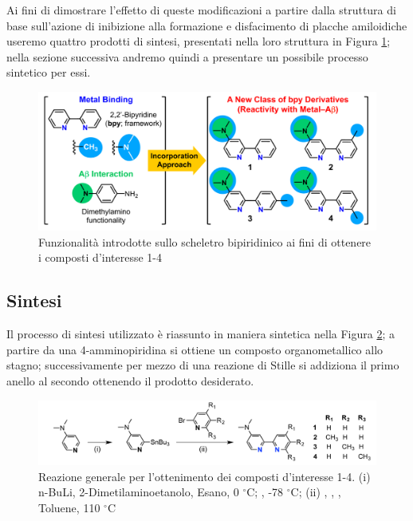 \documentclass[a4paper, 12pt]{article}
\begin{document}
Ai fini di dimostrare l'effetto di queste modificazioni a partire dalla struttura di base sull'azione di inibizione alla formazione e disfacimento di placche amiloidiche useremo quattro prodotti di sintesi, presentati nella loro struttura in Figura \ref{fig:bpy_mod}; nella sezione successiva andremo quindi a presentare un possibile processo sintetico per essi.

\begin{figure}[H]
	\centering
	\includegraphics[width=\linewidth]{immagini/bpy_mod.png}
	\caption{Funzionalità introdotte sullo scheletro bipiridinico ai fini di ottenere i composti d'interesse 1-4}
	\label{fig:bpy_mod}
\end{figure}

\subsection{Sintesi}
Il processo di sintesi utilizzato è riassunto in maniera sintetica nella Figura \ref{fig:rea_g}; a partire da una 4-amminopiridina si ottiene un composto organometallico allo stagno; successivamente per mezzo di una reazione di Stille si addiziona il primo anello al secondo ottenendo il prodotto desiderato.

\begin{figure}[H]
	\centering
	\includegraphics[width=\linewidth]{immagini/rea_g.png}
	\caption{Reazione generale per l'ottenimento dei composti d'interesse 1-4. (i) n-BuLi, 2-Dimetilaminoetanolo, Esano, 0 $^\circ$C; , -78 $^\circ$C; (ii) , , , Toluene, 110 $^\circ$C }
	\label{fig:rea_g}
\end{figure}
\end{document}

